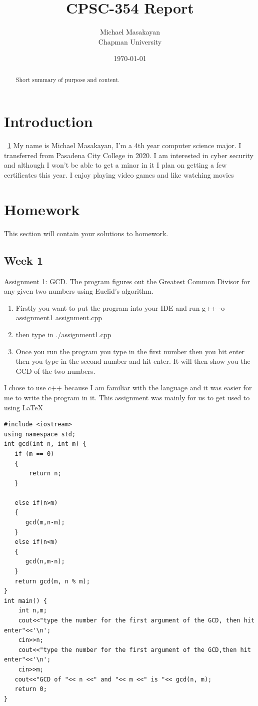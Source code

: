 \documentclass{article}
\title{CPSC-354 Report}
\author{Michael Masakayan  \\ Chapman University}
\date{\today}
\theoremstyle{theorem}
\theoremstyle{definition}
\theoremstyle{remark}
\begin{document}
\maketitle

\begin{abstract}
Short  summary of purpose and content.
\end{abstract}
\tableofcontents


\section{Introduction}\label{intro}

~\ref{intro} My name is Michael Masakayan, I'm a 4th year computer science major. I transferred from Pasadena City College in 2020. I am interested in cyber security and although I won't be able to get a minor in it I plan on getting a few certificates this year. I enjoy playing video games and like watching movies


\section{Homework}\label{homework}

This section will contain your solutions to homework.

\subsection{Week 1}
 Assignment 1: GCD. The program figures out the Greatest Common Divisor for any given two numbers using Euclid’s algorithm.
\begin{enumerate}

\item Firstly you want to put the program into your IDE and run g++ -o assignment1 assignment.cpp
\item then type in ./assignment1.cpp
\item Once you run the program you type in the first number then you hit enter then you type in the second number and hit enter. It will then show you the GCD of the two numbers.
    \end{enumerate}
      I chose to use c++ because I am familiar with the language and it was easier for me to write the program in it. This assignment was mainly for us to get used to using LaTeX
\begin{lstlisting}
#include <iostream>
using namespace std;
int gcd(int n, int m) {
   if (m == 0)
   {
       return n;
   }

   else if(n>m)
   {
      gcd(m,n-m);
   }
   else if(n<m)
   {
      gcd(n,m-n);
   }
   return gcd(m, n % m);
}
int main() {
    int n,m;
    cout<<"type the number for the first argument of the GCD, then hit enter"<<'\n';
    cin>>n;
    cout<<"type the number for the first argument of the GCD,then hit enter"<<'\n';
    cin>>m;
   cout<<"GCD of "<< n <<" and "<< m <<" is "<< gcd(n, m);
   return 0;
}
\end{lstlisting}
\end{document}
